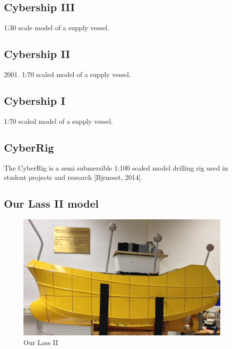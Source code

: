 \documentclass[a4paper,twoside,english]{report}
\begin{document}
\subsection{Cybership III}

1:30 scale model of a supply vessel.

\clearpage{}

\subsection{Cybership II}

2001. 1:70 scaled model of a supply vessel.\clearpage{}

\subsection{Cybership I}

1:70 scaled model of a supply vessel.

\clearpage{}

\subsection{CyberRig}

The CyberRig is a semi submersible 1:100 scaled model drilling rig
used in student projects and research {[}Bjrneset, 2014{]}.

\clearpage{}

\subsection{Our Lass II model}

\begin{figure}
\centering \includegraphics[width=0.95\textwidth]{fig/ourlass} \caption{\label{fig: Our Lass II}Our Lass II}
\end{figure}
\end{document}

